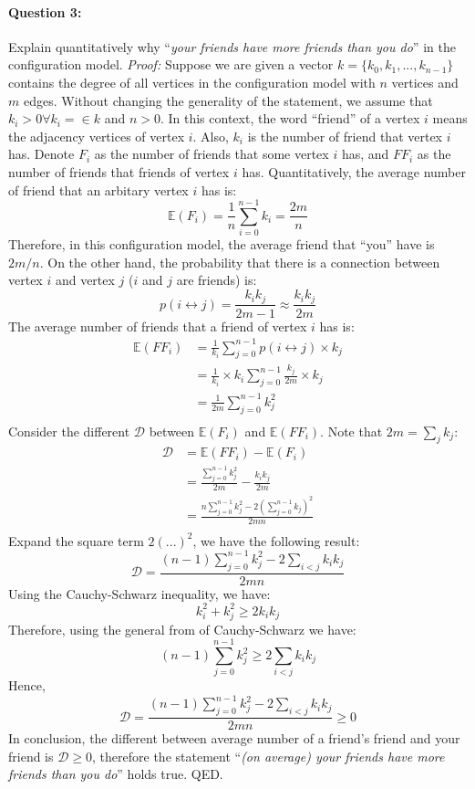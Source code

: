 \documentclass[a4paper,12pt]{article}
\begin{document}
\paragraph{Question 3:} Explain quantitatively why ``\emph{your friends have more friends than you do}'' in the configuration model.
\noindent
\emph{Proof: } Suppose we are given a vector $k = \{k_0, k_1, ..., k_{n-1}\}$ contains the degree of all vertices in the configuration model with $n$ vertices and $m$ edges. Without changing the generality of the statement, we assume that $k_i > 0 \forall k_i = \in k$ and $n > 0$. In this context, the word ``friend'' of a vertex $i$ means the adjacency vertices of vertex $i$. Also, $k_i$ is the number of friend that vertex $i$ has. Denote $F_i$ as the number of friends that some vertex $i$ has, and $FF_i$ as the number of friends that friends of vertex $i$ has. Quantitatively, the average number of friend that an arbitary vertex $i$ has is:
$$ \mathds{E}(F_i) = \frac{1}{n} \sum_{i=0}^{n-1} k_i = \frac{2m}{n} $$
Therefore, in this configuration model, the average friend that ``you'' have is $2m/n$. On the other hand, the probability that there is a connection between vertex $i$ and vertex $j$ ($i$ and $j$ are friends) is:
$$ p(i \leftrightarrow j) = \frac{k_ik_j}{2m - 1} \approx \frac{k_ik_j}{2m} $$
The average number of friends that a friend of vertex $i$ has is:
\begin{equation*}
  \begin{aligned}
\mathds{E}(FF_i) & = \frac{1}{k_i} \sum_{j = 0}^{n-1} p(i \leftrightarrow j) \times k_j \\
& = \frac{1}{k_i} \times k_i \sum_{j = 0}^{n-1} \frac{k_j}{2m} \times k_j \\
& = \frac{1}{2m} \sum_{j = 0}^{n-1} k_j^2 \\
  \end{aligned}
\end{equation*}
Consider the different $\mathcal{D}$ between $\mathds{E}(F_i)$ and $\mathds{E}(FF_i)$. Note that $2m = \sum_{j} k_j$:
\begin{equation*}
  \begin{aligned}
    \mathcal{D} & = \mathds{E}(FF_i) - \mathds{E}(F_i) \\
    & = \frac{\displaystyle\sum_{j = 0}^{n-1} k_j^2}{2m} - \frac{k_ik_j}{2m} \\
    & = \frac{n \displaystyle\sum_{j = 0}^{n-1} k_j^2 - 2 \left(\sum_{j = 0}^{n-1} k_j \right)^2 }{2mn} \\
  \end{aligned}
\end{equation*}
Expand the square term $2(...)^2$, we have the following result:
$$\mathcal{D} = \frac{(n-1) \displaystyle\sum_{j = 0}^{n-1} k_j^2 - 2 \sum_{i < j} k_ik_j}{2mn}$$
Using the Cauchy-Schwarz inequality, we have:
$$ k_i^2 + k_j^2 \geq 2k_ik_j $$
Therefore, using the general from of Cauchy-Schwarz we have:
$$ (n-1) \sum_{j = 0}^{n-1} k_j^2 \geq 2 \sum_{i < j} k_ik_j $$
Hence,
$$\mathcal{D} = \frac{(n-1) \displaystyle\sum_{j = 0}^{n-1} k_j^2 - 2 \sum_{i < j} k_ik_j}{2mn} \geq 0$$
In conclusion, the different between average number of a friend's friend and your friend is $\mathcal{D} \geq 0$, therefore the statement ``\emph{(on average) your friends have more friends than you do}'' holds true. QED.
\end{document}
